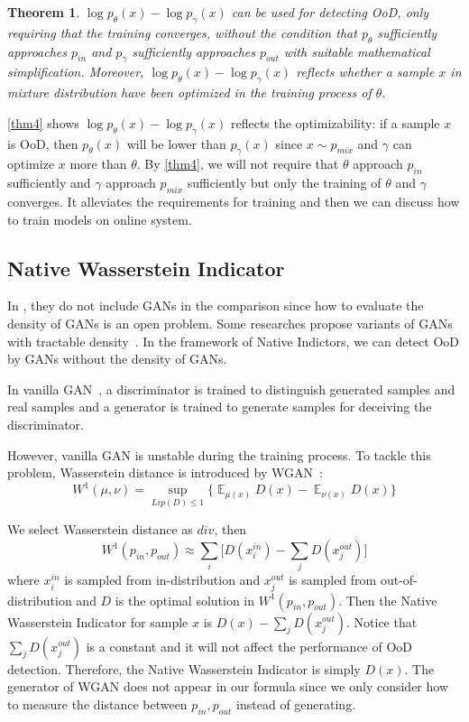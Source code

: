 \documentclass[letterpaper]{article} %
\newtheorem{theorem}{Theorem}
\newcommand{\E}{\operatorname{\mathbb{E}}}
\newcommand{\pin}{p_{in}}
\newcommand{\pout}{p_{out}}
\newcommand{\pmix}{p_{mix}}
\begin{document}
\begin{theorem}\label{thm5}
	$\log p_\theta(x) - \log p_\gamma(x)$ can be used for detecting OoD, only requiring that the training converges, without the condition that $p_\theta$ sufficiently approaches $\pin$ and $p_\gamma$ sufficiently approaches $\pout$ with suitable mathematical simplification. Moreover, $\log p_\theta(x) - \log p_\gamma(x)$ reflects whether a sample $x$ in mixture distribution have been optimized in the training process of $\theta$. 
\end{theorem}

\cref{thm4} shows $\log p_\theta(x) - \log p_\gamma(x)$ reflects the optimizability: if a sample $x$ is OoD, then $p_\theta(x)$ will be lower than $p_\gamma(x)$ since $x \sim \pmix$ and $\gamma$ can optimize $x$ more than $\theta$. By \cref{thm4}, we will not require that $\theta$ approach $\pin$ sufficiently and $\gamma$ approach $\pmix$ sufficiently but only the training of $\theta$ and $\gamma$ converges. It alleviates the requirements for training and then we can discuss how to train models on online system. 

\subsection{Native Wasserstein Indicator}
In \cite{nalisnick2018deep}, they do not include GANs in the comparison since how to evaluate the density of GANs is an open problem. Some researches propose  variants of GANs with tractable density~\cite{kumar2019maximum}. In the framework of Native Indictors, we can detect OoD by GANs without the density of GANs. 

In vanilla GAN~\cite{goodfellow2014generative}, a discriminator is trained to distinguish generated samples and real samples and  a generator is trained to generate samples for deceiving the discriminator.

However, vanilla GAN is unstable during the training process. To tackle this problem, Wasserstein distance is introduced by WGAN~\cite{arjovsky2017wasserstein}:
\begin{equation}
	W^1(\mu, \nu) = \sup_{Lip(D) \leq 1} \{\E_{\mu(x)} D(x)  - \E_{\nu(x)} D(x)\}
\end{equation}

We select Wasserstein distance as $div$, then
\begin{equation}
	W^1(\pin, \pout) \approx \sum_i \Big[D(x_i^{in}) - \sum_j D(x_j^{out})\Big]
\end{equation} 
where $x_i^{in}$ is sampled from in-distribution and $x_j^{out}$ is sampled from out-of-distribution and $D$ is the optimal solution in $W^1(\pin, \pout)$. Then the Native Wasserstein Indicator for sample $x$ is $D(x) - \sum_{j} D(x_j^{out})$. Notice that $\sum_{j} D(x_j^{out})$ is a constant and it will not affect the performance of OoD detection. Therefore, the Native Wasserstein Indicator is simply $D(x)$. The generator of WGAN does not appear in our formula since we only consider how to measure the distance between $\pin, \pout$ instead of generating. 
\end{document}
